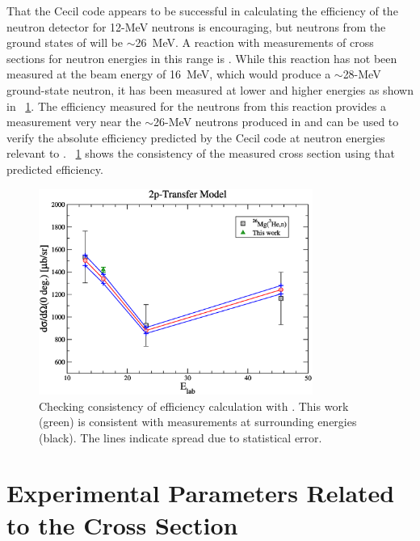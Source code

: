 That the Cecil code appears to be successful in calculating the efficiency of the neutron detector for 12-MeV neutrons is encouraging, but neutrons from the ground states of \reaction will be $\sim$26~MeV.  A reaction with measurements of cross sections for neutron energies in this range is \MgReaction.  While this reaction has not been measured at the beam energy of 16~MeV, which would produce a $\sim$28-MeV ground-state neutron, it has been measured at lower and higher energies \cite{MgCrossSection1,Bohne_Mg} as shown in {\fig}~\ref{fig:efficiencyCalib}.  The efficiency measured for the neutrons from this reaction provides a measurement very near the $\sim$26-MeV neutrons produced in \reaction and can be used to verify the absolute efficiency predicted by the Cecil code at neutron energies relevant to \reaction.  {\fig}~\ref{fig:efficiencyCalib} shows the consistency of the measured cross section using that predicted efficiency.
\begin{figure}[!htbp]
\centering
\includegraphics[width=0.8\textwidth]{figures/magnesiumMatch.eps}
\caption{Checking consistency of efficiency calculation with \MgReaction.  This work (green) is consistent with measurements at surrounding energies (black).  The lines indicate spread due to statistical error.}
\label{fig:efficiencyCalib}
\end{figure}

\section{Experimental Parameters Related to the Cross Section}

